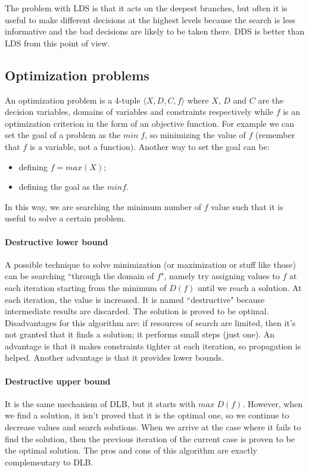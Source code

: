 \documentclass[10pt,a4paper]{article}
\begin{document}
The problem with LDS is that it acts on the deepest branches, but often it is
useful to make different decisions at the highest levels because the search is
less informative and the bad decisions are likely to be taken there. DDS is
better than LDS from this point of view.

\subsection{Optimization problems}
An optimization problem is a 4-tuple $\langle X, D, C, f \rangle$ where $X$,
$D$ and $C$ are the decision variables, domains of variables and constraints
respectively while $f$ is an optimization criterion in the form of an objective
function. For example we can set the goal of a problem as the $min \; f$, so
minimizing the value of $f$ (remember that $f$ is a variable, not a function).
Another way to set the goal can be:

\begin{itemize}
    \item defining $f = max(X)$;
    \item defining the goal as the $min f$.
\end{itemize}
In this way, we are searching the minimum number of $f$ value such that it is
useful to solve a certain problem.

\paragraph{Destructive lower bound}
A possible technique to solve minimization (or maximization or stuff like those)
can be searching ``through the domain of $f$", namely try assigning values to $f
$ at each iteration starting from the minimum of $D(f)$ until we reach a
solution. At each iteration, the value is increased. It is named ``destructive"
because intermediate results are discarded. The solution is proved to be
optimal. Disadvantages for this algorithm are: if resources of search are
limited, then it's not granted that it finds a solution; it performs small steps
(just one). An advantage is that it makes constraints tighter at each iteration,
so propagation is helped. Another advantage is that it provides lower bounds.

\paragraph{Destructive upper bound}
It is the same mechanism of DLB, but it starts with $max \; D(f)$. However, when
we find a solution, it isn't proved that it is the optimal one, so we continue
to decrease values and search solutions. When we arrive at the case where it
fails to find the solution, then the previous iteration of the current case is
proven to be the optimal solution. The pros and cons of this algorithm are
exactly complementary to DLB.
\end{document}
